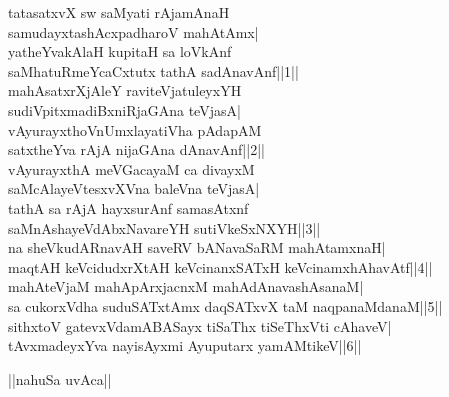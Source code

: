 \documentclass{article}
\begin{document}
tatasatxvX sw saMyati rAjamAnaH\\
samudayxtashAcxpadharoV mahAtAmx|\\
yatheYvakAlaH kupitaH sa loVkAnf\\
saMhatuRmeYcaCxtutx tathA sadAnavAnf||1||\\
mahAsatxrXjAleY raviteVjatuleyxYH\\
sudiVpitxmadiBxniRjaGAna teVjasA|\\
vAyurayxthoVnUmxlayatiVha pAdapAM\\
satxtheYva rAjA nijaGAna dAnavAnf||2||\\
vAyurayxthA meVGacayaM ca divayxM\\
saMcAlayeVtesxvXVna baleVna teVjasA|\\
tathA sa rAjA hayxsurAnf samasAtxnf\\
saMnAshayeVdAbxNavareYH sutiVkeSxNXYH||3||\\
na sheVkudARnavAH saveRV bANavaSaRM mahAtamxnaH|\\
maqtAH keVcidudxrXtAH keVcinanxSATxH keVcinamxhAhavAtf||4||\\
mahAteVjaM mahApArxjacnxM mahAdAnavashAsanaM|\\
sa cukorxVdha suduSATxtAmx daqSATxvX taM naqpanaMdanaM||5||\\
sithxtoV gatevxVdamABASayx tiSaThx tiSeThxVti cAhaveV|\\
tAvxmadeyxYva nayisAyxmi Ayuputarx yamAMtikeV||6||\\

\begin{center}
||nahuSa uvAca||
\end{center}
\end{document}
